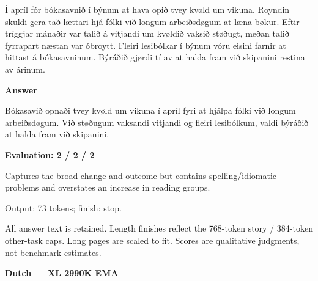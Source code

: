 \documentclass[10pt]{article}
\begin{document}
{\begin{minipage}{\textwidth}
\par\smallskip
Í apríl fór bókasavnið í býnum at hava opið tvey kvøld um vikuna. Royndin skuldi gera tað lættari hjá fólki við longum arbeiðsdøgum at læna bøkur. Eftir tríggjar mánaðir var talið á vitjandi um kvøldið vaksið støðugt, meðan talið fyrrapart næstan var óbroytt. Fleiri lesibólkar í býnum vóru eisini farnir at hittast á bókasavninum. Býráðið gjørdi tí av at halda fram við skipanini restina av árinum.\par\smallskip
\textbf{Answer}\par Bókasavið opnaði tvey kvøld um vikuna í apríl fyri at hjálpa fólki við longum arbeiðsdøgum. Við støðugum vaksandi vitjandi og fleiri lesibólkum, valdi býráðið at halda fram við skipanini.\par\smallskip
\textbf{Evaluation: 2 / 2 / 2}\par Captures the broad change and outcome but contains spelling/idiomatic problems and overstates an increase in reading groups.
\par {\color{gray} Output: 73 tokens; finish: stop.}\par
\medskip\footnotesize All answer text is retained. Length finishes reflect the 768-token story / 384-token other-task caps. Long pages are scaled to fit. Scores are qualitative judgments, not benchmark estimates.
\end{minipage}}%
\noindent\ifdim\dimexpr\ht\languagepage+\dp\languagepage\relax>0.93\textheight%
\resizebox*{!}{0.93\textheight}{\usebox{\languagepage}}%
\else\usebox{\languagepage}\fi%
\clearpage
{\Large\bfseries Dutch --- XL 2990K EMA}\par\smallskip
\end{document}
